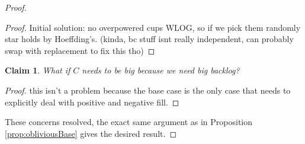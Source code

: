 \documentclass[twocolumn]{article}[10pt]
\newtheorem{clm}{Claim}
\begin{document}
\begin{proof}
{\begin{proof}
  Initial solution: no overpowered cups WLOG, so if we pick them randomly star holds
  by Hoeffding's. (kinda, bc stuff isnt really independent, can probably swap
  with replacement to fix this tho)
  
\end{proof}
\begin{clm}
  What if $C$ needs to be big because we need big backlog? 
\end{clm}
\begin{proof}
 this isn't a problem because the base case is the only case that needs to
 explicitly deal with positive and negative fill.
\end{proof}
These concerns resolved, the exact same argument as in Proposition
\ref{prop:obliviousBase} gives the desired result.
}
\end{proof}
\end{document}
